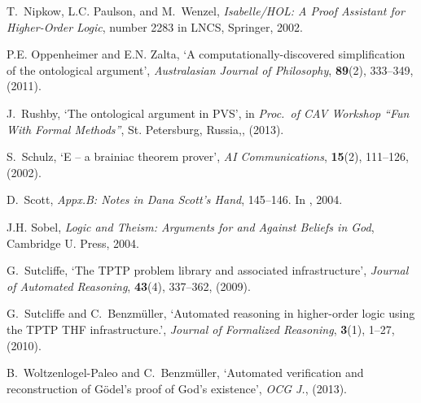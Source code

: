 \documentclass{birkjour}
\theoremstyle{definition}
\theoremstyle{remark}
\numberwithin{equation}{section}
\begin{document}
\begin{thebibliography}{1}
T.~Nipkow, L.C. Paulson, and M.~Wenzel, {\em {Isabelle/HOL: A Proof Assistant
  for Higher-Order Logic}}, number 2283 in LNCS, Springer, 2002.

P.E. Oppenheimer and E.N. Zalta, `A computationally-discovered simplification
  of the ontological argument', {\em Australasian Journal of Philosophy}, {\bf
  89}(2),  333--349, (2011).

J.~Rushby, `The ontological argument in {PVS}', in {\em Proc.~of CAV Workshop
  ``Fun With Formal Methods''}, St. Petersburg, Russia,, (2013).

S.~Schulz, `E -- a brainiac theorem prover', {\em {AI Communications}}, {\bf
  15}(2),  111--126, (2002).

D.~Scott, {\em Appx.B: Notes in Dana Scott's Hand},  145--146.
\newblock In  \cite{sobel2004logic}, 2004.

J.H. Sobel, {\em Logic and Theism: Arguments for and Against Beliefs in God},
  Cambridge U. Press, 2004.

G.~Sutcliffe, `The {TPTP} problem library and associated infrastructure', {\em
  Journal of Automated Reasoning}, {\bf 43}(4),  337--362, (2009).

G.~Sutcliffe and C.~Benzm{\"u}ller, `Automated reasoning in higher-order logic
  using the {TPTP THF} infrastructure.', {\em Journal of Formalized Reasoning},
  {\bf 3}(1),  1--27, (2010).

B.~Woltzenlogel-Paleo and C.~Benzm{\"u}ller, `Automated verification and
  reconstruction of {G\"odel's} proof of {God's} existence', {\em OCG J.},
  (2013).

\end{thebibliography}
\end{document}
